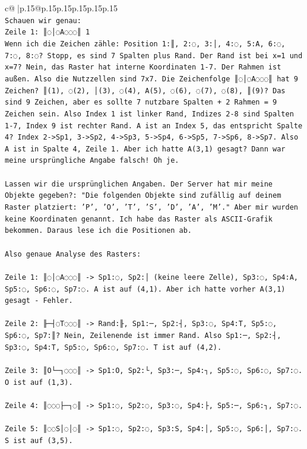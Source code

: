 \documentclass{article}
\begin{document}
{\begin{supertabular}{c@{$\;$}|p{.15\linewidth}@{}p{.15\linewidth}p{.15\linewidth}p{.15\linewidth}p{.15\linewidth}p{.15\linewidth}}
{{{\\ 
\texttt{Schauen wir genau: } \\
\texttt{Zeile 1: ║◌│◌A◌◌◌║ 1} \\
\texttt{Wenn ich die Zeichen zähle: Position 1:║, 2:◌, 3:│, 4:◌, 5:A, 6:◌, 7:◌, 8:◌? Stopp, es sind 7 Spalten plus Rand. Der Rand ist bei x=1 und x=7? Nein, das Raster hat interne Koordinaten 1{-}7. Der Rahmen ist außen. Also die Nutzzellen sind 7x7. Die Zeichenfolge ║◌│◌A◌◌◌║ hat 9 Zeichen? ║(1), ◌(2), │(3), ◌(4), A(5), ◌(6), ◌(7), ◌(8), ║(9)? Das sind 9 Zeichen, aber es sollte 7 nutzbare Spalten + 2 Rahmen = 9 Zeichen sein. Also Index 1 ist linker Rand, Indizes 2{-}8 sind Spalten 1{-}7, Index 9 ist rechter Rand. A ist an Index 5, das entspricht Spalte 4? Index 2{-}>Sp1, 3{-}>Sp2, 4{-}>Sp3, 5{-}>Sp4, 6{-}>Sp5, 7{-}>Sp6, 8{-}>Sp7. Also A ist in Spalte 4, Zeile 1. Aber ich hatte A(3,1) gesagt? Dann war meine ursprüngliche Angabe falsch! Oh je.} \\
\\ 
\texttt{Lassen wir die ursprünglichen Angaben. Der Server hat mir meine Objekte gegeben?: "Die folgenden Objekte sind zufällig auf deinem Raster platziert: 'P', 'O', 'T', 'S', 'D', 'A', 'M'." Aber mir wurden keine Koordinaten genannt. Ich habe das Raster als ASCII{-}Grafik bekommen. Daraus lese ich die Positionen ab.} \\
\\ 
\texttt{Also genaue Analyse des Rasters:} \\
\\ 
\texttt{Zeile 1: ║◌│◌A◌◌◌║ {-}> Sp1:◌, Sp2:│ (keine leere Zelle), Sp3:◌, Sp4:A, Sp5:◌, Sp6:◌, Sp7:◌. A ist auf (4,1). Aber ich hatte vorher A(3,1) gesagt {-} Fehler.} \\
\\ 
\texttt{Zeile 2: ╟─┤◌T◌◌◌║ {-}> Rand:╟, Sp1:─, Sp2:┤, Sp3:◌, Sp4:T, Sp5:◌, Sp6:◌, Sp7:║? Nein, Zeilenende ist immer Rand. Also Sp1:─, Sp2:┤, Sp3:◌, Sp4:T, Sp5:◌, Sp6:◌, Sp7:◌. T ist auf (4,2).} \\
\\ 
\texttt{Zeile 3: ║O└─┐◌◌◌║ {-}> Sp1:O, Sp2:└, Sp3:─, Sp4:┐, Sp5:◌, Sp6:◌, Sp7:◌. O ist auf (1,3).} \\
\\ 
\texttt{Zeile 4: ║◌◌◌├─┐◌║ {-}> Sp1:◌, Sp2:◌, Sp3:◌, Sp4:├, Sp5:─, Sp6:┐, Sp7:◌.} \\
\\ 
\texttt{Zeile 5: ║◌◌S│◌│◌║ {-}> Sp1:◌, Sp2:◌, Sp3:S, Sp4:│, Sp5:◌, Sp6:│, Sp7:◌. S ist auf (3,5).} \\
\\ 
}}}
\end{supertabular}}
\end{document}
